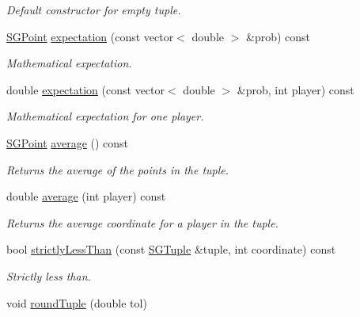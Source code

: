 \begin{DoxyCompactItemize}
\begin{DoxyCompactList}\small\item\em Default constructor for empty tuple. \end{DoxyCompactList}\item 
\hyperlink{classSGPoint}{S\-G\-Point} \hyperlink{classSGTuple_a95eb1d50e77aac6971fac366d9fdb73e}{expectation} (const vector$<$ double $>$ \&prob) const 
\begin{DoxyCompactList}\small\item\em Mathematical expectation. \end{DoxyCompactList}\item 
double \hyperlink{classSGTuple_a73fcc6c4b904f9df9cf3e435dbaa8a44}{expectation} (const vector$<$ double $>$ \&prob, int player) const 
\begin{DoxyCompactList}\small\item\em Mathematical expectation for one player. \end{DoxyCompactList}\item 
\hypertarget{classSGTuple_a56b33132903ed7ab3560fcd3ce583b59}{\hyperlink{classSGPoint}{S\-G\-Point} \hyperlink{classSGTuple_a56b33132903ed7ab3560fcd3ce583b59}{average} () const }\label{classSGTuple_a56b33132903ed7ab3560fcd3ce583b59}

\begin{DoxyCompactList}\small\item\em Returns the average of the points in the tuple. \end{DoxyCompactList}\item 
\hypertarget{classSGTuple_a0400cf2edf7f4a04c232540ad2e11fe1}{double \hyperlink{classSGTuple_a0400cf2edf7f4a04c232540ad2e11fe1}{average} (int player) const }\label{classSGTuple_a0400cf2edf7f4a04c232540ad2e11fe1}

\begin{DoxyCompactList}\small\item\em Returns the average coordinate for a player in the tuple. \end{DoxyCompactList}\item 
bool \hyperlink{classSGTuple_a13c10cd325cb7b2c6b7a5fc55ea0d353}{strictly\-Less\-Than} (const \hyperlink{classSGTuple}{S\-G\-Tuple} \&tuple, int coordinate) const 
\begin{DoxyCompactList}\small\item\em Strictly less than. \end{DoxyCompactList}\item 
\hypertarget{classSGTuple_a348c27be7bd4c7fd42341814d30b9d3f}{void \hyperlink{classSGTuple_a348c27be7bd4c7fd42341814d30b9d3f}{round\-Tuple} (double tol)}\label{classSGTuple_a348c27be7bd4c7fd42341814d30b9d3f}


\end{DoxyCompactItemize}
